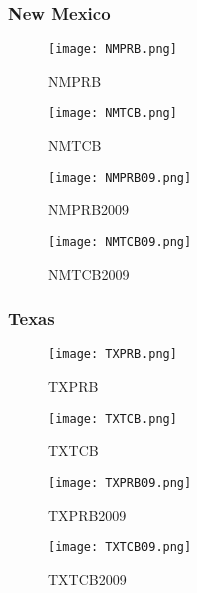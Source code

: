 \documentclass{mcmthesis}
\begin{document}
\subsubsection{New Mexico}
\begin{figure}[H]
\begin{minipage}[htb]{0.5\textwidth}
\centering
\texttt{[image: NMPRB.png]}
\caption{NMPRB} \label{fig:NMPRB}
\end{minipage}
\begin{minipage}[htb]{0.5\textwidth}
\centering
\texttt{[image: NMTCB.png]}
\caption{NMTCB} \label{fig:NMTCB}
\end{minipage}
\end{figure}

\begin{figure}[H]
\begin{minipage}[htb]{0.5\textwidth}
\centering
\texttt{[image: NMPRB09.png]}
\caption{NMPRB2009} \label{fig:NMPRB2009}
\end{minipage}
\begin{minipage}[htb]{0.5\textwidth}
\centering
\texttt{[image: NMTCB09.png]}
\caption{NMTCB2009} \label{fig:NMTCB2009}
\end{minipage}
\end{figure}

\subsubsection{Texas}
\begin{figure}[H]
\begin{minipage}[htb]{0.5\textwidth}
\centering
\texttt{[image: TXPRB.png]}
\caption{TXPRB} \label{fig:TXPRB}
\end{minipage}
\begin{minipage}[htb]{0.5\textwidth}
\centering
\texttt{[image: TXTCB.png]}
\caption{TXTCB} \label{fig:TXTCB}
\end{minipage}
\end{figure}

\begin{figure}[H]
\begin{minipage}[htb]{0.5\textwidth}
\centering
\texttt{[image: TXPRB09.png]}
\caption{TXPRB2009} \label{fig:TXPRB2009}
\end{minipage}
\begin{minipage}[htb]{0.5\textwidth}
\centering
\texttt{[image: TXTCB09.png]}
\caption{TXTCB2009} \label{fig:TXTCB2009}
\end{minipage}
\end{figure}
\end{document}
